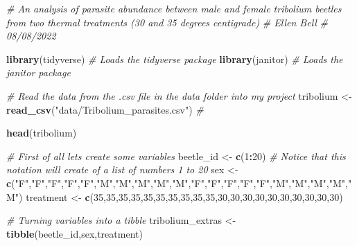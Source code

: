 \documentclass[
]{book}
\newenvironment{Shaded}{\begin{snugshade}}{\end{snugshade}}
\newcommand{\CommentTok}[1]{\textcolor[rgb]{0.56,0.35,0.01}{\textit{#1}}}
\newcommand{\DecValTok}[1]{\textcolor[rgb]{0.00,0.00,0.81}{#1}}
\newcommand{\FunctionTok}[1]{\textcolor[rgb]{0.13,0.29,0.53}{\textbf{#1}}}
\newcommand{\NormalTok}[1]{#1}
\newcommand{\OtherTok}[1]{\textcolor[rgb]{0.56,0.35,0.01}{#1}}
\newcommand{\SpecialCharTok}[1]{\textcolor[rgb]{0.81,0.36,0.00}{\textbf{#1}}}
\newcommand{\StringTok}[1]{\textcolor[rgb]{0.31,0.60,0.02}{#1}}
\begin{document}
\begin{Shaded}
\begin{Highlighting}[]
\CommentTok{\# An analysis of parasite abundance between male and female tribolium beetles from two thermal treatments (30 and 35 degrees centigrade)}
\CommentTok{\# Ellen Bell }
\CommentTok{\# 08/08/2022}

\FunctionTok{library}\NormalTok{(tidyverse) }\CommentTok{\# Loads the tidyverse package}
\FunctionTok{library}\NormalTok{(janitor) }\CommentTok{\# Loads the janitor package}

\CommentTok{\# Read the data from the .csv file in the data folder into my project}
\NormalTok{tribolium }\OtherTok{\textless{}{-}} \FunctionTok{read\_csv}\NormalTok{(}\StringTok{"data/Tribolium\_parasites.csv"}\NormalTok{) }\CommentTok{\#}

\FunctionTok{head}\NormalTok{(tribolium)}

\CommentTok{\# First of all lets create some variables}
\NormalTok{beetle\_id }\OtherTok{\textless{}{-}} \FunctionTok{c}\NormalTok{(}\DecValTok{1}\SpecialCharTok{:}\DecValTok{20}\NormalTok{) }\CommentTok{\# Notice that this notation will create of a list of numbers 1 to 20}
\NormalTok{sex }\OtherTok{\textless{}{-}} \FunctionTok{c}\NormalTok{(}\StringTok{"F"}\NormalTok{,}\StringTok{"F"}\NormalTok{,}\StringTok{"F"}\NormalTok{,}\StringTok{"F"}\NormalTok{,}\StringTok{"F"}\NormalTok{,}\StringTok{"M"}\NormalTok{,}\StringTok{"M"}\NormalTok{,}\StringTok{"M"}\NormalTok{,}\StringTok{"M"}\NormalTok{,}\StringTok{"M"}\NormalTok{,}\StringTok{"F"}\NormalTok{,}\StringTok{"F"}\NormalTok{,}\StringTok{"F"}\NormalTok{,}\StringTok{"F"}\NormalTok{,}\StringTok{"F"}\NormalTok{,}\StringTok{"M"}\NormalTok{,}\StringTok{"M"}\NormalTok{,}\StringTok{"M"}\NormalTok{,}\StringTok{"M"}\NormalTok{,}\StringTok{"M"}\NormalTok{)}
\NormalTok{treatment }\OtherTok{\textless{}{-}} \FunctionTok{c}\NormalTok{(}\DecValTok{35}\NormalTok{,}\DecValTok{35}\NormalTok{,}\DecValTok{35}\NormalTok{,}\DecValTok{35}\NormalTok{,}\DecValTok{35}\NormalTok{,}\DecValTok{35}\NormalTok{,}\DecValTok{35}\NormalTok{,}\DecValTok{35}\NormalTok{,}\DecValTok{35}\NormalTok{,}\DecValTok{35}\NormalTok{,}\DecValTok{30}\NormalTok{,}\DecValTok{30}\NormalTok{,}\DecValTok{30}\NormalTok{,}\DecValTok{30}\NormalTok{,}\DecValTok{30}\NormalTok{,}\DecValTok{30}\NormalTok{,}\DecValTok{30}\NormalTok{,}\DecValTok{30}\NormalTok{,}\DecValTok{30}\NormalTok{,}\DecValTok{30}\NormalTok{)}

\CommentTok{\# Turning variables into a tibble}
\NormalTok{tribolium\_extras }\OtherTok{\textless{}{-}} \FunctionTok{tibble}\NormalTok{(beetle\_id,sex,treatment)}


\end{Highlighting}
\end{Shaded}
\end{document}
